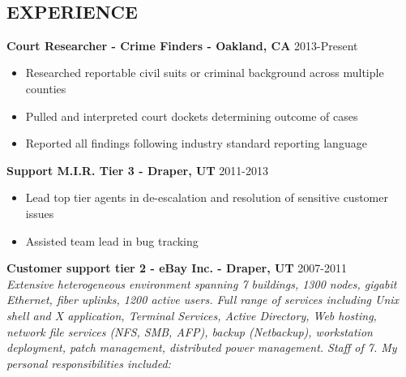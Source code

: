 \documentclass[line,margin]{res}
\begin{document}
\date{\today}
\address{\href{mailto:jefferycoombs@gmail.com}{jefferycoombs@gmail.com} \\ (415) 483-6437}\\

\begin{resume}

\section{EXPERIENCE}
 {\bf Court Researcher - Crime Finders - Oakland, CA} \hfill 2013-Present\\
  \begin{itemize} \itemsep -2pt %
  \item Researched reportable civil suits or criminal background across multiple counties
  \item Pulled and interpreted court dockets determining outcome of cases
  \item Reported all findings following industry standard reporting language
  \end{itemize}
 {\bf Support M.I.R. Tier 3 - Draper, UT} \hfill 2011-2013\\
  \begin{itemize} \itemsep -2pt %
  \item Lead top tier agents in de-escalation and resolution of sensitive customer issues
  \item Assisted team lead in bug tracking
  \end{itemize}
 {\bf Customer support tier 2 - eBay Inc. - Draper, UT} \hfill 2007-2011\\
 {\sl Extensive heterogeneous environment spanning 7 buildings, 1300 nodes, gigabit Ethernet, fiber uplinks, 1200 active users. Full range of services including Unix shell and X application, Terminal Services, Active Directory, Web hosting, network file services (NFS, SMB, AFP), backup (Netbackup), workstation deployment, patch management, distributed power management. Staff of 7. My personal responsibilities included:}

\end{resume}
\end{document}
